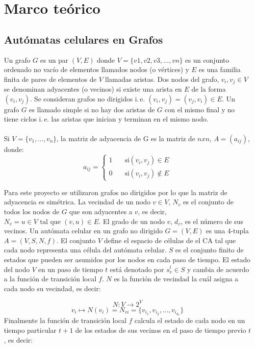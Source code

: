 \chapter{Marco teórico}
\section{Autómatas celulares en Grafos}
Un grafo $G$ es un par $(V, E)$ donde $V=\{v1, v2, v3,...,vn\}$ es un conjunto ordenado no vacío de elementos llamados nodos (o vértices) y $E$ es una familia finita de pares de elementos de $V$ llamadas aristas. Dos nodos del grafo, $v_{i}, v_{j} \in V$ se denominan adyacentes (o vecinos) si existe una arista en $E$  de la forma $(v_{i}, v_{j})$. Se consideran grafos no dirigidos i.\,e. $(v_{i}, v_{j}) = (v_{j}, v_{i}) \in E$. Un grafo $G$ es llamado simple si no hay dos aristas de $G$ con el mismo final y no tiene ciclos i.\,e. las aristas que inician y terminan en el mismo nodo. \cite{graphmit}\\\\
Si $V = \{v_{1},...,v_{n}\}$, la matriz de adyacencia de G es la matriz de $nxn$, $A = (a_{ij})$, donde:
\begin{equation}
	a_{ij} = 
	\begin{cases}
	1 &\quad \text{si} (v_{i}, v_{j} ) \in E\\
	0 &\quad \text{si} (v_{i}, v_{j} ) \notin E
	\end{cases}
\end{equation}

Para este proyecto se utilizaron grafos no dirigidos por lo que la matriz de adyacencia es simétrica.
La vecindad de un nodo $v \in V$, $N_{v}$ es el conjunto de todos los nodos de $G$ que son adyacentes a $v$, es decir, $N_{v} = {u \in V \text{ tal que } (v,u) \in E}$. El grado de un nodo $v$, $d_{v}$, es el número de sus vecinos.
Un autómata celular en un grafo no dirigido $G=(V,E)$ es una 4-tupla $A = (V, S, N, f)$. El conjunto $V$ define el espacio de células de el CA tal que cada nodo representa una célula del autómata celular. $S$ es el conjunto finito de estados que pueden ser asumidos por los nodos en cada paso de tiempo. El estado del nodo $V$ en un paso de tiempo $t$ está denotado por $s_{v}^t \in S$ y cambia de acuerdo a la función de transición local $f$. $N$ es la función de vecindad la cuál asigna a cada nodo su vecindad, es decir:

\begin{equation}
N: V \longrightarrow 2^V 
\end{equation}
\begin{equation}
	v_{i}\mapsto N (v_{i}) = N_{vi} = \{v_{i_1},v_{i_2},...,v_{i_{d_{v}}}\}
\end{equation}
\newpage
Finalmente la función de transición local $f$ calcula el estado de cada nodo en un tiempo particular $t+1$ de los estados de sus vecinos en el paso de tiempo previo $t$, es decir:

